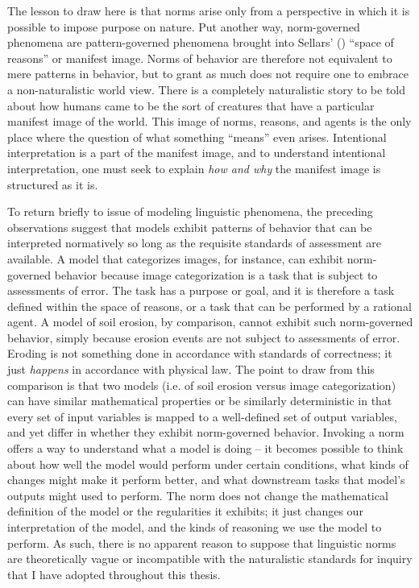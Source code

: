 The lesson to draw here is that norms arise only from a perspective in which it is possible to impose purpose on nature. Put another way, norm-governed phenomena are pattern-governed phenomena brought into Sellars' (\citeyear{Sellars:1963}) ``space of reasons'' or manifest image. Norms of behavior are therefore not equivalent to mere patterns in behavior, but to grant as much does not require one to embrace a non-naturalistic world view. There is a completely naturalistic story to be told about how humans came to be the sort of creatures that have a particular manifest image of the world. This image of norms, reasons, and agents is the only place where the question of what something ``means'' even arises. Intentional interpretation is a part of the manifest image, and to understand intentional interpretation, one must seek to explain \textit{how and why} the manifest image is structured as it is.

To return briefly to issue of modeling linguistic phenomena, the preceding observations suggest that models exhibit patterns of behavior that can be interpreted normatively so long as the requisite standards of assessment are available. A model that categorizes images, for instance, can exhibit norm-governed behavior because image categorization is a task that is subject to assessments of error. The task has a purpose or goal, and it is therefore a task defined within the space of reasons, or a task that can be performed by a rational agent. A model of soil erosion, by comparison, cannot exhibit such norm-governed behavior, simply because erosion events are not subject to assessments of error. Eroding is not something done in accordance with standards of correctness; it just \textit{happens} in accordance with physical law. The point to draw from this comparison is that two models (i.e. of soil erosion versus image categorization) can have similar mathematical properties or be similarly deterministic in that every set of input variables is mapped to a well-defined set of output variables, and yet differ in whether they exhibit norm-governed behavior. Invoking a norm offers a way to understand what a model is doing -- it becomes possible to think about how well the model would perform under certain conditions, what kinds of changes might make it perform better, and what downstream tasks that model's outputs might used to perform. The norm does not change the mathematical definition of the model or the regularities it exhibits; it just changes our interpretation of the model, and the kinds of reasoning we use the model to perform. As such, there is no apparent reason to suppose that linguistic norms are theoretically vague or incompatible with the naturalistic standards for inquiry that I have adopted throughout this thesis.

